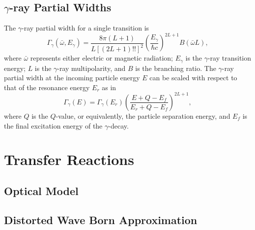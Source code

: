 \subsection{$\gamma$-ray Partial Widths}
The $\gamma$-ray partial width for a single transition is
\begin{equation}
\Gamma_{\gamma}(\bar{\omega}, E_{\gamma}) = \frac{8 \pi (L + 1)}{L\left[(2L + 1)!!\right]^{2}} \left(\frac{E_{\gamma}}{\hbar c}\right)^{2L+1} B(\bar{\omega}L),
\end{equation}
where $\bar{\omega}$ represents either electric or magnetic radiation; $E_{\gamma}$ is the $\gamma$-ray transition energy; $L$ is the $\gamma$-ray multipolarity, and $B$ is the branching ratio. The $\gamma$-ray partial width at the incoming particle energy $E$ can be scaled with respect to that of the resonance energy $E_{r}$ as in
\begin{equation}
\Gamma_{\gamma}(E) = \Gamma_{\gamma}(E_{r}) \left(\frac{E + Q - E_{f}}{E_{r} + Q - E_{f}}\right)^{2L+1},
\end{equation}
where $Q$ is the $Q$-value, or equivalently, the particle separation energy, and $E_{f}$ is the final excitation energy of the $\gamma$-decay.

\section{Transfer Reactions}





\subsection{Optical Model} \label{subsec:Optical_Model}

\subsection{Distorted Wave Born Approximation} \label{subsec:DWBA}

